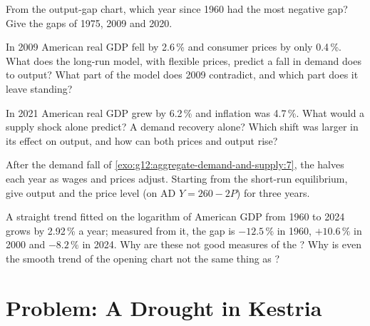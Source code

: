 \begin{exercise}[$\star\star$]\label{exo:g12:aggregate-demand-and-supply:11}
From the output-gap chart, which year since 1960 had the most negative gap? Give the gaps of 1975, 2009 and 2020.
\end{exercise}

\begin{exercise}[$\star\star\star$]\label{exo:g12:aggregate-demand-and-supply:12}
In 2009 American real GDP fell by 2.6\,\% and consumer prices by only 0.4\,\%. What does the long-run model, with flexible prices, predict a fall in demand does to output?
What part of the model does 2009 contradict, and which part does it leave standing?
\end{exercise}

\begin{exercise}[$\star\star\star$]\label{exo:g12:aggregate-demand-and-supply:13}
In 2021 American real GDP grew by 6.2\,\% and inflation was 4.7\,\%. What would a supply shock alone predict? A demand recovery alone? Which shift was larger in its effect on
output, and how can both prices and output rise?
\end{exercise}

\begin{exercise}[$\star\star\star$]\label{exo:g12:aggregate-demand-and-supply:14}
After the demand fall of \cref{exo:g12:aggregate-demand-and-supply:7}, the  halves each year as wages and prices adjust. Starting from the short-run equilibrium,
give output and the price level (on AD $Y = 260 - 2P$) for three years.
\end{exercise}

\begin{exercise}[$\star\star\star$]\label{exo:g12:aggregate-demand-and-supply:15}
A straight trend fitted on the logarithm of American GDP from 1960 to 2024 grows by 2.92\,\% a year; measured from it, the gap is $-12.5\,\%$ in 1960, $+10.6\,\%$ in 2000 and
$-8.2\,\%$ in 2024. Why are these not good measures of the ? Why is even the smooth trend of the opening chart not the same thing as ?
\end{exercise}

\section{Problem: A Drought in Kestria}


